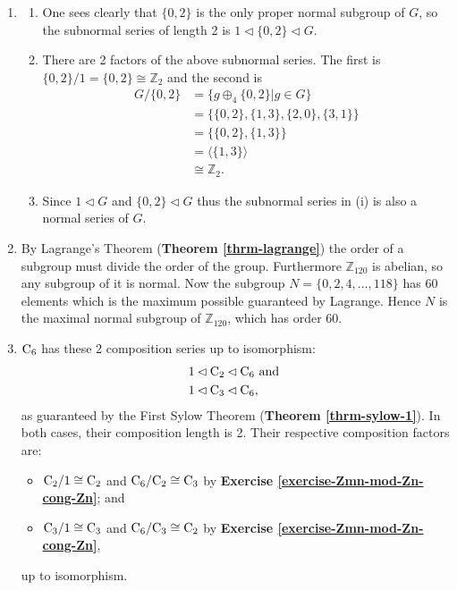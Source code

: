 \begin{enumerate}
    \item \begin{enumerate}[label=(\roman*)]
        \item One sees clearly that $\{0, 2\}$ is the only proper normal subgroup of $G$, so the subnormal series of length 2 is $1 \lhd \{0, 2\} \lhd G$.
        \item There are 2 factors of the above subnormal series. The first is $\{0, 2\} / 1 = \{0, 2\} \cong \mathbb{Z}_2$ and the second is
        \begin{align*}
            G / \{0, 2\} &= \{g \oplus_4 \{0, 2\} \vert g \in G\}\\
            &= \{\{0, 2\}, \{1, 3\}, \{2, 0\}, \{3, 1\}\}\\
            &= \{\{0, 2\}, \{1, 3\}\}\\
            &= \langle \{1, 3\} \rangle\\
            &\cong \mathbb{Z}_2.
        \end{align*}
        \item Since $1 \lhd G$ and $\{0, 2\} \lhd G$ thus the subnormal series in (i) is also a normal series of $G$.
    \end{enumerate}
    
    \item By Lagrange's Theorem (\textbf{Theorem \ref{thrm-lagrange}}) the order of a subgroup must divide the order of the group. Furthermore $\mathbb{Z}_{120}$ is abelian, so any subgroup of it is normal. Now the subgroup $N = \{0, 2, 4, \dots, 118\}$ has 60 elements which is the maximum possible guaranteed by Lagrange. Hence $N$ is the maximal normal subgroup of $\mathbb{Z}_{120}$, which has order 60.
    
    \item $\mathrm{C}_{6}$ has these 2 composition series up to isomorphism:
    \begin{align*}
        &1 \lhd \mathrm{C}_{2} \lhd \mathrm{C}_{6} \text{ and }\\
        &1 \lhd \mathrm{C}_{3} \lhd \mathrm{C}_{6},
    \end{align*}
    as guaranteed by the First Sylow Theorem (\textbf{Theorem \ref{thrm-sylow-1}}). In both cases, their composition length is 2. Their respective composition factors are:
    \begin{itemize}
        \item $\mathrm{C}_{2} / 1 \cong \mathrm{C}_{2}$ and $\mathrm{C}_{6} / \mathrm{C}_{2} \cong \mathrm{C}_{3}$ by \textbf{Exercise \ref{exercise-Zmn-mod-Zn-cong-Zn}}; and
        \item $\mathrm{C}_{3} / 1 \cong \mathrm{C}_{3}$ and $\mathrm{C}_{6} / \mathrm{C}_{3} \cong \mathrm{C}_{2}$ by \textbf{Exercise \ref{exercise-Zmn-mod-Zn-cong-Zn}},
    \end{itemize}
    up to isomorphism.
    

\end{enumerate}
